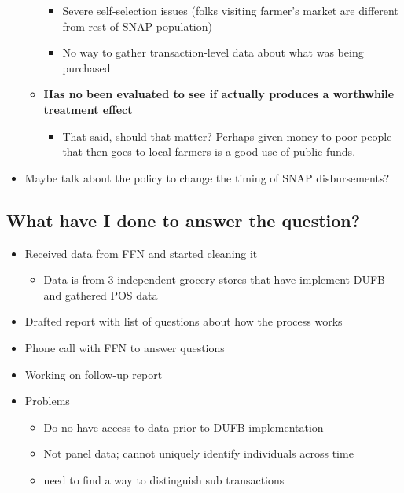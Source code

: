 \documentclass[11pt,letterpaper,]{book}
\providecommand{\tightlist}{%
  \setlength{\itemsep}{0pt}\setlength{\parskip}{0pt}}
\begin{document}
\begin{itemize}
\begin{itemize}
    \begin{itemize}
    \tightlist
    \item
      Severe self-selection issues (folks visiting farmer's market are
      different from rest of SNAP population)
    \item
      No way to gather transaction-level data about what was being
      purchased
    \end{itemize}
  \item
    \textbf{Has no been evaluated to see if actually produces a
    worthwhile treatment effect}

    \begin{itemize}
    \tightlist
    \item
      That said, should that matter? Perhaps given money to poor people
      that then goes to local farmers is a good use of public funds.
    \end{itemize}
  \end{itemize}
\item
  Maybe talk about the policy to change the timing of SNAP
  disbursements?
\end{itemize}

\subsection{What have I done to answer the
question?}\label{what-have-i-done-to-answer-the-question}

\begin{itemize}
\tightlist
\item
  Received data from FFN and started cleaning it

  \begin{itemize}
  \tightlist
  \item
    Data is from 3 independent grocery stores that have implement DUFB
    and gathered POS data
  \end{itemize}
\item
  Drafted report with list of questions about how the process works
\item
  Phone call with FFN to answer questions
\item
  Working on follow-up report
\item
  Problems

  \begin{itemize}
  \tightlist
  \item
    Do no have access to data prior to DUFB implementation
  \item
    Not panel data; cannot uniquely identify individuals across time
  \item
    need to find a way to distinguish sub transactions
  \end{itemize}
\end{itemize}


\end{document}
